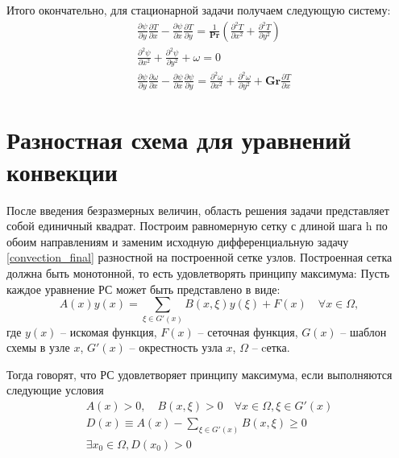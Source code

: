 \documentclass[a4paper, 12pt]{article}
\newcommand{\Pra}{\mathbf{Pr}}
\newcommand{\Gra}{\mathbf{Gr}}
\newcommand{\der}[2]{\frac{\partial {#1}}{\partial {#2}}}
\newcommand{\dder}[2]{\frac{\partial^2 {#1}}{\partial {#2}^2}}
\begin{document}
    Итого окончательно, для стационарной задачи получаем следующую систему:
    \begin{equation}
      \begin{aligned}
        &\der{\psi}{y} \der{T}{x} - \der{\psi}{x} \der{T}{y} = \frac{1}{\Pra}
          \left( \dder{T}{x} + \dder{T}{y} \right)
        \\
        &\dder{\psi}{x} + \dder{\psi}{y} + \omega = 0
        \\
        &\der{\psi}{y} \der{\omega}{x} - \der{\psi}{x} \der{\psi}{y} =
          \dder{\omega}{x} + \dder{\omega}{y} + \Gra \der{T}{x}
      \end{aligned}\label{convection_final}
    \end{equation}
  \pagebreak

  \section{Разностная схема для уравнений конвекции}
    После введения безразмерных величин, область решения задачи представляет
    собой единичный квадрат. Построим равномерную сетку с длиной шага h по обоим
    направлениям и заменим исходную дифференциальную задачу
    \eqref{convection_final} разностной на построенной сетке узлов. Построенная
    сетка должна быть монотонной, то есть удовлетворять принципу максимума:
    \bigskip
    Пусть каждое уравнение РС может быть представлено в виде:
    \begin{equation}
      A(x) y(x) = \sum\limits_{\xi \in G'(x)} B(x,\xi)y(\xi) + F(x) \quad
        \forall x \in \Omega,\label{max_principle}
    \end{equation}
    где $y(x)$ -- искомая функция, $F(x)$ -- сеточная функция, $G(x)$ --
    шаблон схемы в узле $x$, $G'(x)$ -- окрестность узла $x$, $\Omega$ -- cетка.

    Тогда говорят, что РС удовлетворяет принципу максимума, если выполняются
    следующие условия
    \begin{gather*}
      A(x) > 0, \quad B(x,\xi) > 0 \quad \forall x \in \Omega, \xi \in G'(x)
      \\
      D(x) \equiv A(x)- \sum\limits_{\xi \in G'(x)} B(x,\xi) \geq 0
      \\
      \exists x_0 \in \Omega, D(x_0) > 0
    \end{gather*}
\end{document}
